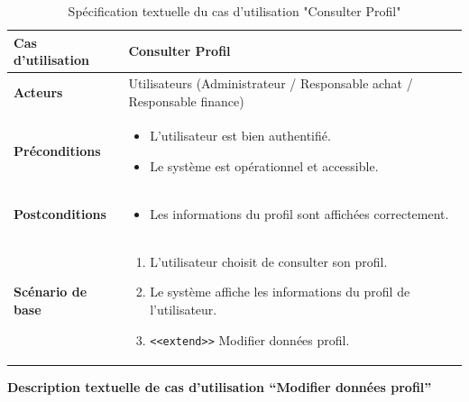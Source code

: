 \documentclass[a4paper,11pt]{report}
\begin{document}
\begin{table}[H]
  \centering
  \caption{Spécification textuelle du cas d'utilisation "Consulter Profil"}
  \begin{tabularx}{\textwidth}{|l|X|}
    \hline
    \textbf{Cas d'utilisation} & Consulter Profil \\ \hline
    \textbf{Acteurs}           & Utilisateurs (Administrateur / Responsable achat / Responsable finance) \\ \hline
    \textbf{Préconditions}     &
    \begin{itemize}[leftmargin=*]
      \item L’utilisateur est bien authentifié.
      \item Le système est opérationnel et accessible.
    \end{itemize} \\ \hline
    \textbf{Postconditions}    &
    \begin{itemize}[leftmargin=*]
      \item Les informations du profil sont affichées correctement.
    \end{itemize} \\ \hline
    \textbf{Scénario de base}  &
    \begin{enumerate}[leftmargin=*]
      \item L’utilisateur choisit de consulter son profil.
      \item Le système affiche les informations du profil de l’utilisateur.
      \item \texttt{<<extend>>} Modifier données profil.
    \end{enumerate} \\ \hline
  \end{tabularx}
\end{table}
\endgroup

\newpage
\textbf{Description textuelle de cas d’utilisation “Modifier données profil”}
\end{document}
